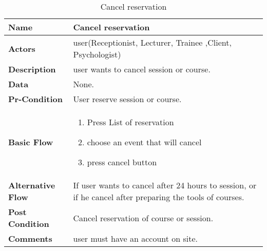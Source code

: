 \documentclass[../Psychological_system_web_application.tex]{subfiles}
\begin{document}
	\begin{center}
		\begin{table}[h]
			\begin{tabular}{ | m{4cm} | m{10cm}| } 
				\hline
			 	\textbf{\large Name}& Cancel reservation\\ 
				\hline
			  	\textbf{\large Actors}& user(Receptionist, Lecturer, Trainee ,Client, Psychologist)\\ 
				\hline
			  	\textbf{\large Description}& user wants to cancel session or course.\\ 
				\hline
				\textbf{\large Data}& None.\\ 
				\hline
				 \textbf{\large Pr-Condition}& User reserve session or course. \\ 
				\hline
				\textbf{\large Basic Flow}&\begin{enumerate}
				\item
					Press List of reservation
				\item
					choose an event that will cancel
				\item 
					press cancel button \end{enumerate}\\
					\hline
				\textbf{\large Alternative Flow}& If user wants to cancel after 24 hours to session, or if he cancel after preparing the tools of courses.\\ 
				\hline
				\textbf{\large Post Condition}& Cancel reservation of course or session.\\ 
				\hline
				\textbf{\large Comments}& user must have an account on site.\\ 
				\hline
			\end{tabular}
			\caption{Cancel reservation}
			\label{table:CANCEL-RESERVATION}
		\end{table}
	\end{center}
	
\end{document}

